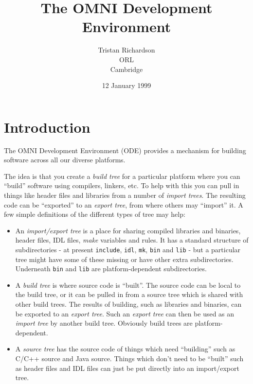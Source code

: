 \documentclass[11pt,twoside,onecolumn]{article}
\title{The OMNI Development Environment}
\author{Tristan Richardson\\
        ORL\\
        Cambridge}
\date{12 January 1999}
\begin{document}
\maketitle

\vspace{0.2in}

\tableofcontents

\newpage

\section{Introduction}

The OMNI Development Environment (ODE) provides a mechanism for building
software across all our diverse platforms.

The idea is that you create a {\em build tree} for a particular platform where
you can ``build'' software using compilers, linkers, etc.  To help with this
you can pull in things like header files and libraries from a number of {\em
import trees}.  The resulting code can be ``exported'' to an {\em export tree},
from where others may ``import'' it.  A few simple definitions of the different
types of tree may help:

\begin{itemize}

\item An {\em import/export tree} is a place for sharing compiled libraries and
binaries, header files, IDL files, {\em make} variables and rules.  It has a
standard structure of subdirectories - at present {\tt include}, {\tt idl},
{\tt mk}, {\tt bin} and {\tt lib} - but a particular tree might have some of
these missing or have other extra subdirectories.  Underneath {\tt bin} and
{\tt lib} are platform-dependent subdirectories.

\item A {\em build tree} is where source code is ``built''.  The source code
can be local to the build tree, or it can be pulled in from a source tree which
is shared with other build trees.  The results of building, such as libraries
and binaries, can be exported to an {\em export tree}.  Such an {\em export
tree} can then be used as an {\em import tree} by another build tree.
Obviously build trees are platform-dependent.

\item A {\em source tree} has the source code of things which need ``building''
such as C/C++ source and Java source.  Things which don't need to be ``built''
such as header files and IDL files can just be put directly into an
import/export tree.

\end{itemize}
\end{document}

